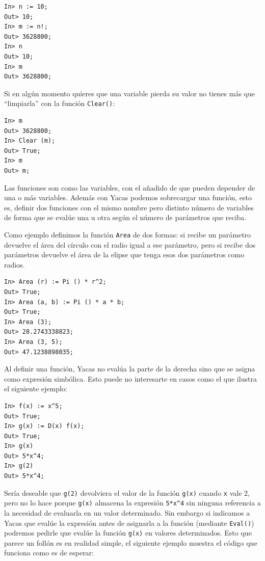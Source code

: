 \begin{verbatim}
In> n := 10;
Out> 10;
In> m := n!;
Out> 3628800;
In> n
Out> 10;
In> m
Out> 3628800;
\end{verbatim}

Si en algún momento quieres que una variable pierda su valor no tienes
más que ``limpiarla'' con la función \verb+Clear()+:

\begin{verbatim}
In> m
Out> 3628800;
In> Clear (m);
Out> True;
In> m
Out> m;
\end{verbatim}

Las funciones  son como las  variables, con  el añadido de  que pueden
depender de una o más  variables. Además con Yacas podemos sobrecargar
una función, esto  es, definir dos funciones con el  mismo nombre pero
distinto número de  variables de forma que se evalúe  una u otra según
el número de parámetros que reciba.

Como ejemplo definimos la función \verb+Area+ de dos formas: si recibe
un parámetro  devuelve el área  del círculo con  el radio igual  a ese
parámetro, pero si recibe dos parámetros devuelve el área de la elipse
que tenga esos dos parámetros como radios.

\begin{verbatim}
In> Area (r) := Pi () * r^2;
Out> True;
In> Area (a, b) := Pi () * a * b;
Out> True;
In> Area (3);
Out> 28.2743338823;
In> Area (3, 5);
Out> 47.1238898035;
\end{verbatim}

Al definir  una función, Yacas no  evalúa la parte de  la derecha sino
que se asigna  como expresión simbólica. Esto puede  no interesarte en
casos como el que ilustra el siguiente ejemplo:

\begin{verbatim}
In> f(x) := x^5;
Out> True;
In> g(x) := D(x) f(x);
Out> True;
In> g(x)
Out> 5*x^4;
In> g(2)
Out> 5*x^4;
\end{verbatim}

Sería  deseable que  \verb+g(2)+  devolviera el  valor  de la  función
\verb+g(x)+  cuando  \verb+x+  vale  $2$,   pero  no  lo  hace  porque
\verb+g(x)+ almacena la expresión  \verb+5*x^4+ sin ninguna referencia
a la  necesidad de evaluarla en  un valor determinado. Sin  embargo si
indicamos a  Yacas que  evalúe la  expresión antes  de asignarla  a la
función  (mediante  \verb+Eval()+)  podremos  pedirle  que  evalúe  la
función \verb+g(x)+ en valores determinados. Esto que parece un follón
es  en realidad  simple, el  siguiente ejemplo  muestra el  código que
funciona como es de esperar:

